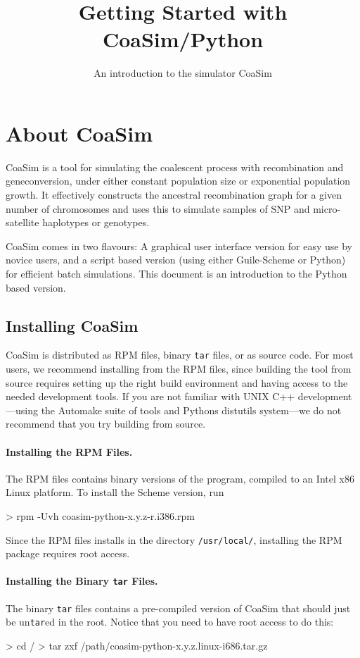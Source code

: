 \documentclass{manual}
\title{Getting Started with CoaSim/Python}
\subtitle{An introduction to the simulator CoaSim}
\begin{document}
\section{About CoaSim}

CoaSim is a tool for simulating the coalescent process with
recombination and geneconversion, under either constant population
size or exponential population growth.  It effectively constructs the
ancestral recombination graph for a given number of chromosomes and
uses this to simulate samples of SNP and micro-satellite haplotypes or
genotypes.

CoaSim comes in two flavours: A graphical user interface version for
easy use by novice users, and a script based version (using either
Guile-Scheme or Python) for efficient batch simulations.  This
document is an introduction to the Python based version.


\subsection{Installing CoaSim}

CoaSim is distributed as RPM files, binary \texttt{tar} files, or as
source code.  For most users, we recommend installing from the RPM
files, since building the tool from source requires setting up the
right build environment and having access to the needed development
tools.  If you are not familiar with UNIX C++ development---using the
Automake suite of tools and Pythons distutils system---we do not
recommend that you try building from source.

\paragraph{Installing the RPM Files.}

The RPM files contains binary versions of the program, compiled to an
Intel x86 Linux platform.  To install the Scheme version, run
\begin{code}
> rpm -Uvh coasim-python-x.y.z-r.i386.rpm
\end{code}
Since the RPM files installs in the directory \verb?/usr/local/?,
installing the RPM package requires root access.

\paragraph{Installing the Binary \texttt{tar} Files.}

The binary \texttt{tar} files contains a pre-compiled version of
CoaSim that should just be un\texttt{tar}ed in the root.  Notice that
you need to have root access to do this:
\begin{code}
> cd /
> tar zxf /path/coasim-python-x.y.z.linux-i686.tar.gz
\end{code}
\end{document}
